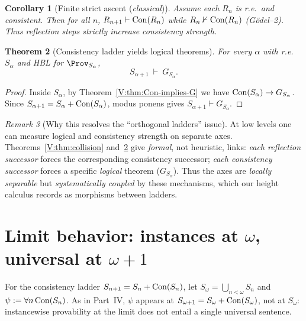 \documentclass[11pt]{article}
\newtheorem{theorem}{Theorem}[section]
\newtheorem{corollary}[theorem]{Corollary}
\theoremstyle{definition}
\theoremstyle{remark}
\newtheorem{remark}[theorem]{Remark}
\begin{document}
\begin{corollary}[Finite strict ascent (\emph{classical})]\label{V:cor:finite-ascent}
Assume each \(R_n\) is r.e.\ and consistent. Then for all \(n\),
\(R_{n+1}\vdash \mathrm{Con}(R_n)\) while \(R_n\nvdash \mathrm{Con}(R_n)\) (G\"odel–2). Thus reflection steps strictly increase consistency strength.
\end{corollary}

\begin{theorem}[Consistency ladder yields logical theorems]\label{V:thm:cons-yields-G}
For every \(\alpha\) with r.e.\ \(S_\alpha\) and HBL for \(\Prov_{S_\alpha}\),
\[
S_{\alpha+1}\ \vdash\ G_{S_\alpha}.
\]
\end{theorem}

\begin{proof}
Inside \(S_\alpha\), by Theorem~\ref{V:thm:Con-implies-G} we have \(\mathrm{Con}(S_\alpha)\to G_{S_\alpha}\).
Since \(S_{\alpha+1}=S_\alpha+\mathrm{Con}(S_\alpha)\), modus ponens gives \(S_{\alpha+1}\vdash G_{S_\alpha}\).
\end{proof}

\begin{remark}[Why this resolves the “orthogonal ladders” issue]
At low levels one can measure logical and consistency strength on separate axes.
Theorems~\ref{V:thm:collision} and~\ref{V:thm:cons-yields-G} give \emph{formal}, not heuristic, links:
\emph{each reflection successor} forces the corresponding consistency successor; \emph{each consistency successor}
forces a specific \emph{logical} theorem ($G_{S_\alpha}$). Thus the axes are \emph{locally separable}
but \emph{systematically coupled} by these mechanisms, which our height calculus records as
morphisms between ladders.
\end{remark}

\section{Limit behavior: instances at \texorpdfstring{$\omega$}{ω}, universal at \texorpdfstring{$\omega{+}1$}{ω+1}}

For the consistency ladder \(S_{n+1}=S_n+\mathrm{Con}(S_n)\), let \(S_\omega=\bigcup_{n<\omega}S_n\) and
\(\psi:=\forall n\,\mathrm{Con}(S_n)\). As in Part~IV, \(\psi\) appears at \(S_{\omega+1}=S_\omega+\mathrm{Con}(S_\omega)\),
not at \(S_\omega\): instancewise provability at the limit does not entail a single universal sentence.
\end{document}
